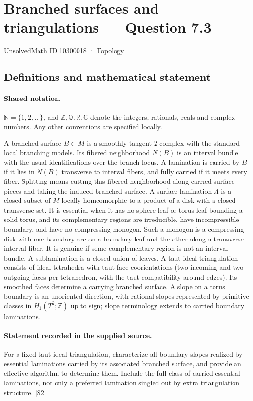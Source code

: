 \documentclass[11pt]{article}
\newcommand{\sref}[2]{\hyperlink{source:#1:#2}{[S#2]}}
\begin{document}
\setcounter{section}{10300017}
\section{Branched surfaces and triangulations — Question 7.3}\label{10300018}
{\small\sffamily UnsolvedMath ID 10300018 · Topology}
\subsection{Definitions and mathematical statement}

\paragraph{Shared notation.}$\mathbb N=\{1,2,\ldots\}$, and $\mathbb Z,\mathbb Q,\mathbb R,\mathbb C$ denote the integers, rationals, reals and complex numbers. Any other conventions are specified locally.


A branched surface $B\subset M$ is a smoothly tangent $2$-complex with the standard local branching models. Its fibered neighborhood $N(B)$ is an interval bundle with the usual identifications over the branch locus. A lamination is carried by $B$ if it lies in $N(B)$ transverse to interval fibers, and fully carried if it meets every fiber. Splitting means cutting this fibered neighborhood along carried surface pieces and taking the induced branched surface. A surface lamination $\Lambda$ is a closed subset of $M$ locally homeomorphic to a product of a disk with a closed transverse set. It is essential when it has no sphere leaf or torus leaf bounding a solid torus, and its complementary regions are irreducible, have incompressible boundary, and have no compressing monogon. Such a monogon is a compressing disk with one boundary arc on a boundary leaf and the other along a transverse interval fiber. It is genuine if some complementary region is not an interval bundle. A sublamination is a closed union of leaves. A taut ideal triangulation consists of ideal tetrahedra with taut face coorientations (two incoming and two outgoing faces per tetrahedron, with the taut compatibility around edges). Its smoothed faces determine a carrying branched surface. A slope on a torus boundary is an unoriented direction, with rational slopes represented by primitive classes in $H_1(T^2;\mathbb Z)$ up to sign; slope terminology extends to carried boundary laminations.
\paragraph{Statement recorded in the supplied source.}
For a fixed taut ideal triangulation, characterize all boundary slopes realized by essential laminations carried by its associated branched surface, and provide an effective algorithm to determine them. Include the full class of carried essential laminations, not only a preferred lamination singled out by extra triangulation structure. \sref{10300018}{2}
\end{document}
